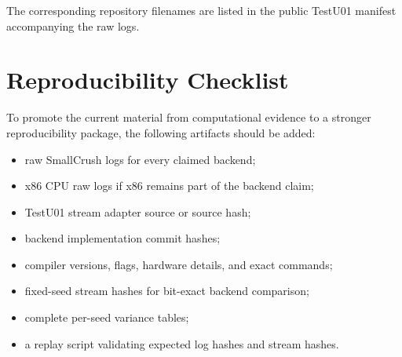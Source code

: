 \documentclass[11pt,a4paper]{article}
\begin{document}
The corresponding repository filenames are listed in the public TestU01 manifest accompanying the raw logs.

\section{Reproducibility Checklist}

To promote the current material from computational evidence to a stronger reproducibility package, the following artifacts should be added:

\begin{itemize}[nosep]
  \item raw SmallCrush logs for every claimed backend;
  \item x86 CPU raw logs if x86 remains part of the backend claim;
  \item TestU01 stream adapter source or source hash;
  \item backend implementation commit hashes;
  \item compiler versions, flags, hardware details, and exact commands;
  \item fixed-seed stream hashes for bit-exact backend comparison;
  \item complete per-seed variance tables;
  \item a replay script validating expected log hashes and stream hashes.
\end{itemize}
\end{document}
